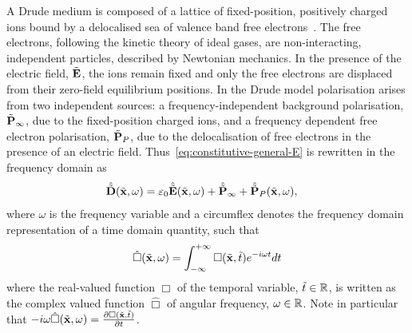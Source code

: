 %
%
A Drude medium is composed of a lattice of fixed-position, positively charged
ions bound by a delocalised sea of valence band free
electrons~\cite{Ashcroft:2005wp,Bandyopadhyay:1503732}. The free electrons,
following the kinetic theory of ideal gases, are non-interacting, independent
particles, described by Newtonian mechanics. In the presence of the electric
field, $\tilde{\mathbf{E}}$, the ions remain fixed and only the free electrons are
displaced from their zero-field equilibrium positions. In the Drude model
polarisation arises from two independent sources: a frequency-independent
background polarisation, $\tilde{\mathbf{P}}_{\infty}$, due to the fixed-position charged ions,
and a frequency dependent free electron polarisation, $\tilde{\mathbf{P}}_P$, due to the
delocalisation of free electrons in the presence of an electric field. Thus~\eqref{eq:constitutive-general-E} is rewritten in the frequency domain as
\begin{align}
  \hat{\tilde{\mathbf{D}}}(\tilde{\mathbf{x}},\omega) &= \varepsilon_0 \hat{\tilde{\mathbf{E}}}(\tilde{\mathbf{x}}, \omega) + \hat{\tilde{\mathbf{P}}}_{\infty} + \hat{\tilde{\mathbf{P}}}_P(\tilde{\mathbf{x}},\omega) ,
                                    \label{eq:constitutive_equations_drude_model}
\end{align}
where $\omega$ is the frequency variable and a circumflex denotes the frequency
domain representation of a time domain quantity, such that
$$
\hat{\Box}(\tilde{\mathbf{x}},\omega) = \int_{-\infty}^{+\infty} \Box(\tilde{\mathbf{x}},\tilde{t})
e^{-i \omega t} dt
$$
where the real-valued function $\Box$ of the temporal variable, $\tilde{t} \in
\mathbb{R}$, is written as the complex valued function $\hat{\Box}$ of angular
frequency, $\omega \in \mathbb{R}$.
Note in particular that $- i \omega \hat{\Box}(\tilde{\mathbf{x}},\omega) =
\frac{\partial  \Box(\tilde{\mathbf{x}},\tilde{t}) }{\partial t}$.


